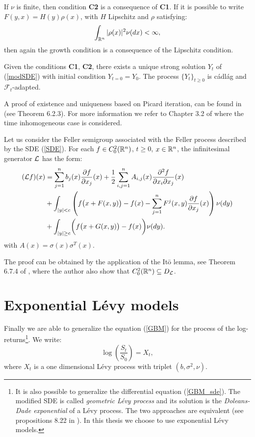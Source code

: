If $\nu$ is finite, then condition \textbf{C2} is a consequence of \textbf{C1}. If it is possible to write $F(y,x) = H(y)\rho(x)$, with $H$ Lipschitz and 
$\rho$ satisfying:
\begin{equation}\label{rho}
 \int_{\mathbb{R}^n} |\rho(x)|^2 \nu(dx) < \infty,
\end{equation}
then again the growth condition is a consequence of the Lipschitz condition.
\begin{Theorem}
 Given the conditions \textbf{C1}, \textbf{C2}, there exists a unique strong solution $Y_t$ of (\ref{modSDE}) with initial condition $Y_{t=0}=Y_{0}$.
 The process $\{Y_t\}_{t\geq 0}$ is cádlág and $\mathcal{F}_t$-adapted.
\end{Theorem}
A proof of existence and uniqueness based on Picard iteration, can be found in \cite{Applebaum} (see Theorem 6.2.3). For more information we refer to Chapter 3.2 of
\cite{Skorohod} where the time inhomogeneous case is considered. 


\begin{Theorem}
Let us consider the Feller semigroup associated with the Feller process described by the SDE (\ref{SDE}).
For each $f\in C_0^{2}(\mathbb{R}^n)$, $t\geq0$, $x\in \mathbb{R}^n$,
the infinitesimal generator $\mathcal{L}$ has the form:
\begin{align} \label{gen_jumpdiff}
  (\mathcal{L} f)(x) &=  \sum_{j=1}^n b_j(x) \frac{\partial f}{\partial x_j}(x) +
  \frac{1}{2} \sum_{i,j=1}^n A_{i,j}(x) \frac{\partial^2 f}{\partial x_i \partial x_j}(x)\\  \nonumber
           & + \int_{|y|<c} \left( f\bigl(x+F(x,y)\bigr) - f(x) - \sum_{j=1}^n F^j(x,y) \frac{\partial f}{\partial x_j}(x) \right) \nu(dy)  \\ \nonumber
           & + \int_{|y| \geq c} \biggl( f\bigl(x+G(x,y)\bigr) - f(x) \biggr) \nu(dy).   \nonumber
\end{align} 
with $A(x) = \sigma(x) \sigma^T(x)$.
\end{Theorem}
The proof can be obtained by the application of the It\={o} lemma, see Theorem 6.7.4 of \cite{Applebaum}, where the author also show that $C_0^{2}(\mathbb{R}^n) \subseteq D_{\mathcal{L}}$.   




\section{Exponential Lévy models}\label{Section_ELM}

Finally we are able to generalize the equation (\ref{GBM}) for the process of the log-returns\footnote{
It is also possible to generalize the differential equation (\ref{GBM_sde}). The modified SDE is called \emph{geometric Lévy process}
and its solution is the \emph{Doleans-Dade exponential} of a Lévy process. The two approaches are equivalent (see propositions 8.22 in \cite{Cont}).
In this thesis we choose to use exponential Lévy models.}.
We write:
\begin{equation}
 \log \left( \frac{S_t}{S_0} \right) = X_t ,
\end{equation}
where $X_t$ is a one dimensional Lévy process with triplet $(b,\sigma^2,\nu)$.

